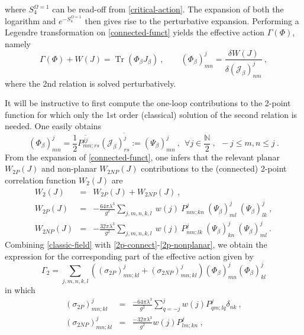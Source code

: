\documentclass[a4paper,11pt,twoside]{article}
\numberwithin{equation}{section}
\DeclareMathOperator{\tr}{Tr}
\theoremstyle{nonumberplain}
\newcounter{and}
\begin{document}
%
where $S^{\Omega=1}_4$ can be read-off from \eqref{critical-action}. The expansion of both the logarithm and $e^{-S^{\Omega=1}_4}$ then gives rise to the perturbative expansion. Performing a Legendre transformation on \eqref{connected-funct} yields the effective action $\Gamma(\Phi)$, namely%
%
\begin{equation}
\Gamma(\Phi) + W(J) = \tr\left( \Phi_\beta J_\beta \right) \ , \qquad (\Phi_\beta)^j_{mn} = \frac{\delta W(J)}{\delta(\mathcal{J}_\beta)^j_{nm}} \ , \label{legendre}
\end{equation}
%
where the 2nd relation is solved perturbatively.\par%
%
It will be instructive to first compute the one-loop contributions to the 2-point function for which only the 1st order (classical) solution of the second relation is needed. One easily obtains%
%
\begin{equation}
(\Phi_\beta)^j_{mn} = \frac{1}{2} P^{j\tilde{j}}_{mn;rs}(\mathcal{J}_\beta)^{\tilde{j}}_{rs}
:= (\Psi_\beta)^j_{mn} \ , \ \ \forall j\in\frac{\mathbb{N}}{2} \ , \ \ -j\le m,n\le j \ . \label{classic-field}
\end{equation}
%
From the expansion of \eqref{connected-funct}, one infers that the relevant planar $W_{2P}(J)$ and non-planar $W_{2NP}(J)$ contributions to the (connected) 2-point correlation function $W_2(J)$ are%
%
\begin{eqnarray}
%
W_2(J) &=& W_{2P}(J) + W_{2NP}(J) \label{2p-connect} \ , \\
%
W_{2P}(J) &=& - \frac{64\pi\lambda^3}{g^2} \sum_{j,m,n,k,l} \ w(j) \ P^j_{nm;kn} \ (\Psi_\beta)^j_{ml} \ (\Psi_\beta)^j_{lk} \ , \label{2p-planar} \\
%
W_{2NP}(J) &=& - \frac{32\pi\lambda^3}{g^2} \sum_{j,m,n,k,l} \ w(j) \ P^j_{nm;lk} \ (\Psi_\beta)^j_{kn} \ (\Psi_\beta)^j_{ml} \ . \label{2p-nonplanar}
%
\end{eqnarray}
%
Combining \eqref{classic-field} with \eqref{2p-connect}-\eqref{2p-nonplanar}, we obtain the expression for the corresponding part of the effective action given by%
%
\begin{equation}
\Gamma_{2} = \sum_{j,m,n,k,l} \left((\sigma_{2P})^j_{mn;kl} + (\sigma_{2NP})^j_{mn;kl}\right)(\Phi_\beta)^j_{mn} (\Phi_\beta)^j_{kl}\label{effect-action-1loop}
\end{equation}
in which
\begin{eqnarray}
%
(\sigma_{2P})^j_{mn;kl} &=& \frac{-64\pi\lambda^3}{g^2} \sum_{q=-j}^j w(j) P^j_{qm;lq} \delta_{nk} \ , \label{eff-act-plan} \\
%
(\sigma_{2NP})^j_{mn;kl} &=& \frac{-32\pi\lambda^3}{g^2} w(j) P^j_{lm;kn} \ , \label{eff-act-np}
%
\end{eqnarray}
\end{document}
